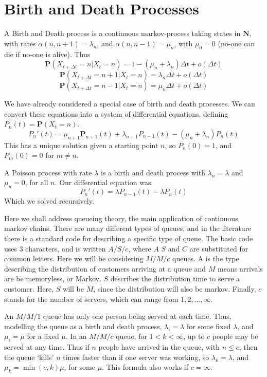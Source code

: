 \section{Birth and Death Processes}

\begin{definition}
    A Birth and Death process is a continuous markov-process taking states in $\mathbf{N}$, with rates $\alpha(n,n+1) = \lambda_n$, and $\alpha(n,n-1) = \mu_n$, with $\mu_0 = 0$ (no-one can die if no-one is alive). Thus
    \[ \mathbf{P}(X_{t + \Delta t} = n | X_t = n) = 1 - (\mu_n + \lambda_n) \Delta t + o(\Delta t) \]
    \[ \mathbf{P}(X_{t + \Delta t} = n + 1 | X_t = n) = \lambda_n \Delta t + o(\Delta t) \]
    \[ \mathbf{P}(X_{t + \Delta t} = n - 1 | X_t = n) = \mu_n \Delta t + o(\Delta t) \]
\end{definition}

We have already considered a special case of birth and death processes. We can convert these equations into a system of differential equations, defining $P_n(t) = \mathbf{P}(X_t = n)$.
%
\[ P_n'(t) = \mu_{n+1} \mathbf{P}_{n+1}(t) + \lambda_{n-1} P_{n-1}(t) - (\mu_n + \lambda_n) P_n(t) \]
%
This has a unique solution given a starting point $n$, so $P_n(0) = 1$, and $P_m(0) = 0$ for $m \neq n$.

\begin{example}
    A Poisson process with rate $\lambda$ is a birth and death process with $\lambda_n = \lambda$ and $\mu_n = 0$, for all $n$. Our differential equation was
    \[ P_n'(t) = \lambda P_{n-1}(t) - \lambda P_n(t)  \]
    Which we solved recursively.
\end{example}

Here we shall address queueing theory, the main application of continuous markov chains. There are many different types of queues, and in the literature there is a standard code for describing a specific type of queue. The basic code uses 3 characters, and is written $A/S/c$, where $A$ $S$ and $C$ are substituted for common letters. Here we will be considering $M/M/c$ queues. A is the type describing the distribution of customers arriving at a queue and $M$ means arrivals are be memoryless, or Markov. $S$ describes the distribution time to serve a customer. Here, $S$ will be $M$, since the distribution will also be markov. Finally, $c$ stands for the number of servers, which can range from $1,2, \dots, \infty$.

An $M/M/1$ queue has only one person being served at each time. Thus, modelling the queue as a birth and death process, $\lambda_i = \lambda$ for some fixed $\lambda$, and $\mu_i = \mu$ for a fixed $\mu$. In an $M/M/c$ queue, for $1 < k < \infty$, up to $c$ people may be served at any time. Thus if $n$ people have arrived in the queue, with $n \leq c$, then the queue `kills' $n$ times faster than if one server was working, so $\lambda_k = \lambda$, and $\mu_k = \min(c,k) \mu$, for some $\mu$. This formula also works if $c = \infty$.

